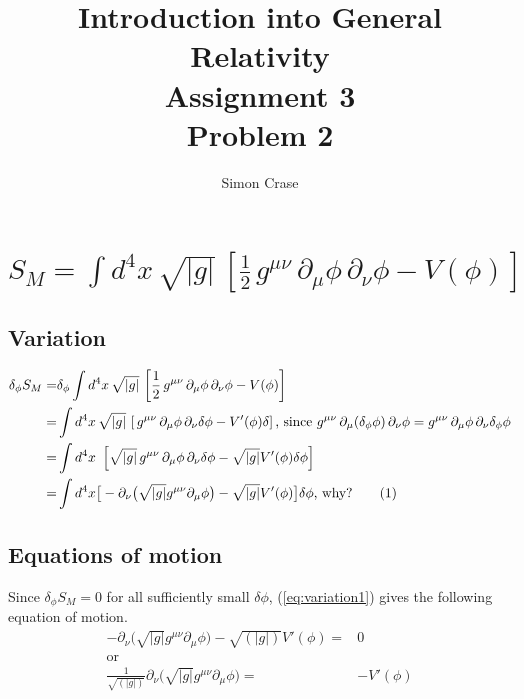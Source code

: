 \documentclass[]{article}
\title{Introduction into General Relativity\\Assignment 3\\Problem 2}
\author{Simon Crase}
\newcommand\numberthis{\addtocounter{equation}{1}\tag{\theequation}}
\begin{document}
\maketitle
\thispagestyle{fancy}

 

\section{$S_M = \int d^4x \, \sqrt{|g|} \, \left[\frac12 \, g^{\mu\nu} \, \partial_\mu \phi \, \partial_\nu \phi - V(\phi)\right]$}
\subsection{Variation}
\begin{align*}
\delta_{\phi} S_M =& \delta_{\phi} \int d^4x \, \sqrt{|g|} \, \left[\frac{1}{2} \, g^{\mu\nu} \, \partial_\mu \phi \, \partial_\nu \phi - V(\phi)\right]\\
=&  \int d^4x \, \sqrt{|g|} \, \left[ \, g^{\mu\nu} \, \partial_\mu \phi \, \partial_\nu \delta \phi - V'(\phi) \delta \right] \text{, since $g^{\mu\nu} \, \partial_\mu (\delta_{\phi} \phi) \, \partial_\nu \phi = g^{\mu\nu} \, \partial_\mu  \phi \, \partial_\nu \delta_{\phi} \phi$}\\
=&  \int d^4x \,  \, \left[ \sqrt{|g|} \, g^{\mu\nu} \, \partial_\mu \phi \, \partial_\nu \delta \phi - \sqrt{|g|} V'(\phi) \delta \phi \right] \\
=& \int d^4x \big[ -\partial_\nu \big(\sqrt{|g|} g^{\mu\nu} \partial_\mu \phi\big) - \sqrt{|g|} V'(\phi)\big] \delta \phi \text{, why?} \numberthis \label{eq:variation1}
\end{align*}
\subsection{Equations of motion}
Since $\delta_{\phi} S_M=0$ for all sufficiently small $\delta \phi$, (\ref{eq:variation1}) gives the following equation of motion.
\begin{align*}
-\partial_\nu \big(\sqrt{|g|} g^{\mu\nu} \partial_\mu \phi\big) - \sqrt{(|g|)} V'(\phi)=&0\\
\text{or}&\\
\frac{1}{\sqrt{(|g|)}} \partial_\nu \big(\sqrt{|g|} g^{\mu\nu} \partial_\mu \phi\big) =& -  V'(\phi)
\end{align*}
\end{document}
